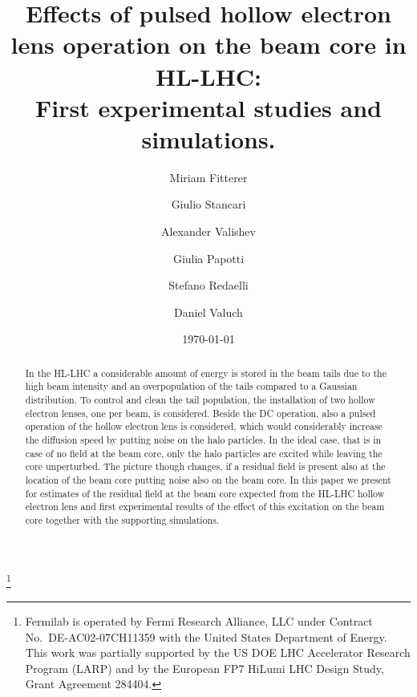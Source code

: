 \documentclass[%
 reprint,
 amsmath,amssymb,
 aps,
prstab,
]{revtex4-1}
\begin{document}
\title{Effects of pulsed hollow electron lens operation on the beam core in HL-LHC: \\First experimental studies and simulations.}%
\thanks{Fermilab is operated by Fermi Research Alliance, LLC under
	Contract No.~DE-AC02-07CH11359 with the United States Department of
	Energy. This work was partially supported by the US DOE LHC
	Accelerator Research Program (LARP) and by the European FP7 HiLumi
	LHC Design Study, Grant Agreement 284404.}

\author{Miriam Fitterer}
\author{Giulio Stancari}%
\author{Alexander Valishev}%
%

\author{Giulia Papotti}
\author{Stefano Redaelli}
\author{Daniel Valuch}
%

\date{\today}%

\begin{abstract}
In the HL-LHC a considerable amount of energy is stored in the beam tails due to the high beam intensity and an overpopulation of the tails compared to a Gaussian distribution. To control and clean the tail population, the installation of two hollow electron lenses, one per beam, is considered. Beside the DC operation, also a pulsed operation of the hollow electron lens is considered, which would considerably increase the diffusion speed by putting noise on the halo particles. In the ideal case, that is in case of no field at the beam core, only the halo particles are excited while leaving the core unperturbed. The picture though changes, if a residual field is present also at the location of the beam core putting noise also on the beam core. In this paper we present for estimates of the residual field at the beam core expected from the HL-LHC hollow electron lens and first experimental results of the effect of this excitation on the beam core together with the supporting simulations.
\end{abstract}


\maketitle
\end{document}
